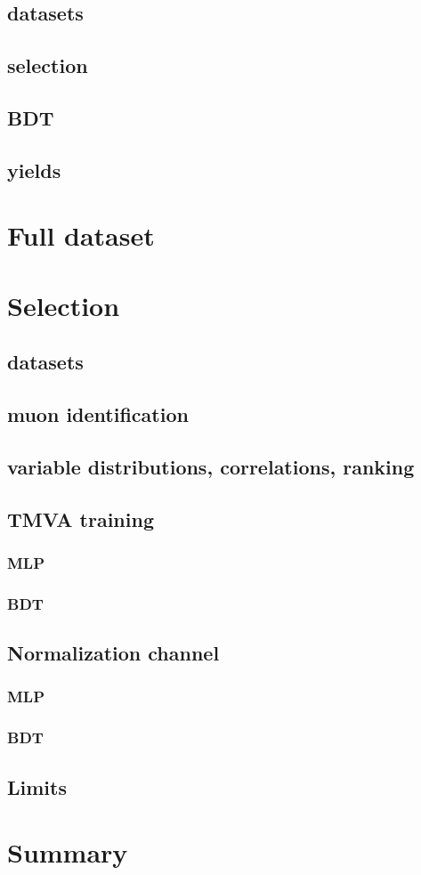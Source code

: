 \documentclass[10pt,a4paper]{article}
\begin{document}
\subsection{datasets}
\subsection{selection}
\subsection{BDT}
\subsection{yields}

\cleardoublepage{}

\section{Full dataset}
\section{Selection}
\subsection{datasets}
\subsection{muon identification}
\subsection{variable distributions, correlations, ranking}
\subsection{TMVA training}
\subsubsection{MLP}
\subsubsection{BDT}
\subsection{Normalization channel}
\subsubsection{MLP}
\subsubsection{BDT}
\subsection{Limits}


\section{Summary}




\end{document}
